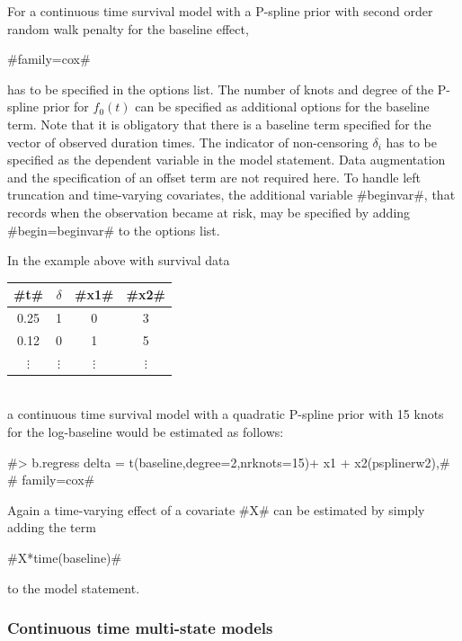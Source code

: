 For a continuous time survival model with a P-spline prior with
second order random walk penalty for the baseline effect,

#family=cox#

has to be specified in the options list. The number of knots and
degree of the P-spline prior for $f_0(t)$ can be specified as
additional options for the baseline term. Note that it is
obligatory that there is a baseline term specified for the vector
of observed duration times. The indicator of non-censoring
$\delta_i$ has to be specified as the dependent variable in the
model statement. Data augmentation and the specification of an
offset term are not required here. To handle left truncation and
time-varying covariates, the additional variable #beginvar#, that
records when the observation became at risk, may be specified by
adding #begin=beginvar# to the options list.

In the example above with survival data

\vspace{0.5cm}

\begin{tabular}{c|c|c|c}
  #t# &   $\delta$ &  #x1# &  #x2#\\\hline\hline
0.25  &  1  &    0  &  3\\\hline 0.12  &  0  &    1  &  5\\\hline
$\vdots$ & $\vdots$ & $\vdots$ & $\vdots$ \\
\end{tabular}
\vspace{0.5cm}\\
a continuous time survival model with a quadratic P-spline prior
with 15 knots for the log-baseline would be estimated as follows:

 #> b.regress delta = t(baseline,degree=2,nrknots=15)+ x1 + x2(psplinerw2),#\\
 #  family=cox#

Again a time-varying effect of a covariate #X# can be estimated by
simply adding the term

#X*time(baseline)#

to the model statement.

\subsubsection{Continuous time multi-state models}
\label{cont_msms_mcmc}


